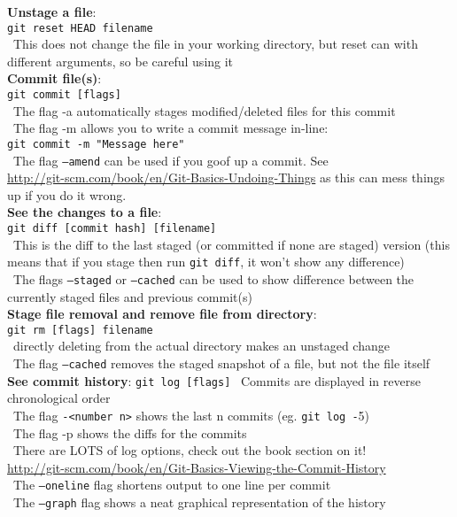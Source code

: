 \documentclass[12pt]{article}
\begin{document}
{{\bf Unstage a file}:\\
\texttt{git reset HEAD filename}\\
\textbullet\, This does not change the file in your working directory, but reset can with different arguments, so be careful using it\\

{\bf Commit file(s)}:\\
\texttt{git commit [flags]}\\
\textbullet\, The flag -a automatically stages modified/deleted files for this commit\\
\textbullet\, The flag -m allows you to write a commit message in-line:\\
 \hspace{5mm}\texttt{git commit -m "Message here"}\\ %
\textbullet\, The flag \texttt{--amend} can be used if you goof up a commit. See\\ \url{http://git-scm.com/book/en/Git-Basics-Undoing-Things} as this can mess things up if you do it wrong.\\

{\bf See the changes to a file}:\\
\texttt{git diff [commit hash] [filename]}\\
\textbullet\, This is the diff to the last staged (or committed if none are staged) version (this means that if you stage then run \texttt{git diff}, it won't show any difference)\\
\textbullet\, The flags \texttt{--staged} or \texttt{--cached} can be used to show difference between the currently staged files and previous commit(s)\\

{\bf Stage file removal and remove file from directory}:\\
\texttt{git rm [flags] filename}\\
\textbullet\, directly deleting from the actual directory makes an unstaged change\\
\textbullet\, The flag \texttt{--cached} removes the staged snapshot of a file, but not the file itself\\

{\bf See commit history}:
\texttt{git log [flags]}
\textbullet\, Commits are displayed in reverse chronological order\\
\textbullet\, The flag \texttt{-<number n>} shows the last n commits (eg. \texttt{git log -}5)\\
\textbullet\, The flag -p shows the diffs for the commits\\
\textbullet\, There are LOTS of log options, check out the book section on it!\\ \url{http://git-scm.com/book/en/Git-Basics-Viewing-the-Commit-History}\\
\textbullet\, The \texttt{--oneline} flag shortens output to one line per commit\\
\textbullet\, The \texttt{--graph} flag shows a neat graphical representation of the history\\

}
\end{document}
